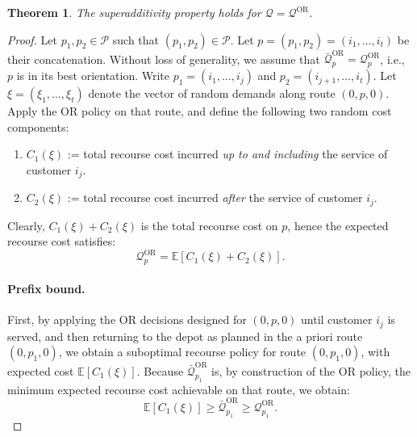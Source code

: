 \documentclass{article}
\newtheorem{theorem}{Theorem}
\begin{document}
\begin{theorem}\label{thm:Q_superadditive}
    The superadditivity property holds for $\mathcal{Q}=\mathcal{Q}^{\text{OR}}$.
\end{theorem}
\begin{proof}
Let $p_1,p_2\in\mathcal{P}$ such that $(p_1,p_2)\in\mathcal{P}$. Let $p = (p_1,p_2) = (i_1,\dots,i_t)$ be their concatenation. Without loss of generality, we assume that $\bar{\mathcal{Q}}^{\text{OR}}_p = \mathcal{Q}^{\text{OR}}_p$, i.e., $p$ is in its best orientation. Write $p_1=(i_1,\dots,i_j)$ and $p_2=(i_{j+1},\dots,i_t)$. Let $\xi=(\xi_1,\dots,\xi_t)$ denote the vector of random demands along route $(0,p,0)$. Apply the OR policy on that route, and define the following two random cost components:
\begin{enumerate}
    \item $C_1(\xi)$ := total recourse cost incurred \emph{up to and including}
            the service of customer $i_j$.
    \item $C_2(\xi)$ := total recourse cost incurred \emph{after}
            the service of customer $i_j$.
\end{enumerate}

Clearly, $C_1(\xi)+C_2(\xi)$ is the total recourse cost on $p$, hence the expected recourse cost satisfies:
\begin{equation}\label{eq:superadd_Q_decomp}
    \mathcal{Q}^{\text{OR}}_{p} = \mathbb E\left[C_1(\xi)+C_2(\xi)\right].
\end{equation}

\paragraph{Prefix bound.}
First, by applying the OR decisions designed for $(0,p,0)$ until customer $i_j$ is served, and then returning to the depot as planned in the a priori route $(0,p_1,0)$, we obtain a suboptimal recourse policy for route $(0,p_1,0)$, with expected cost $\mathbb E[C_1(\xi)]$. Because $\bar{\mathcal{Q}}^{\text{OR}}_{p_1}$ is, by construction of the OR policy, the minimum expected recourse cost achievable on that route, we obtain:
\begin{equation}\label{eq:superadd_prefix}
    \mathbb E[C_1(\xi)] \geq \bar{\mathcal{Q}}^{\text{OR}}_{p_1} \geq \mathcal{Q}^{\text{OR}}_{p_1}.
\end{equation}


\end{proof}
\end{document}
